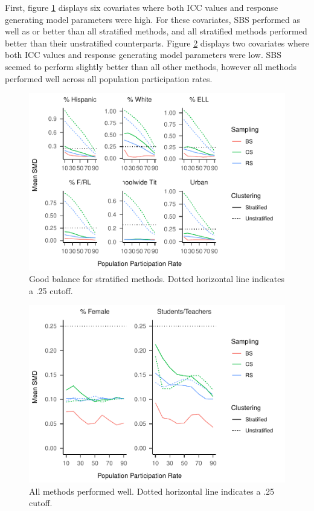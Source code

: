 \documentclass[man,floatsintext]{apa6}
\begin{document}
First, figure \ref{fig:fig-SMD-by-Var-good1} displays six covariates where both ICC values and response generating model parameters were high. For these covariates, SBS performed as well as or better than all stratified methods, and all stratified methods performed better than their unstratified counterparts. Figure \ref{fig:fig-SMD-by-Var-neutral} displays two covariates where both ICC values and response generating model parameters were low. SBS seemed to perform slightly better than all other methods, however all methods performed well across all population participation rates.



\begin{figure}
\centering
\includegraphics{GenSamp-Paper_files/figure-latex/fig-SMD-by-Var-good1-1.pdf}
\caption{\label{fig:fig-SMD-by-Var-good1}Good balance for stratified methods. Dotted horizontal line indicates a .25 cutoff.}
\end{figure}



\begin{figure}
\centering
\includegraphics{GenSamp-Paper_files/figure-latex/fig-SMD-by-Var-neutral-1.pdf}
\caption{\label{fig:fig-SMD-by-Var-neutral}All methods performed well. Dotted horizontal line indicates a .25 cutoff.}
\end{figure}
\end{document}
